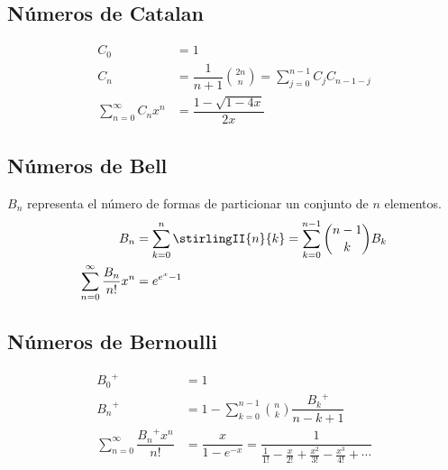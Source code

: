 				\subsection{Números de Catalan}
					\begin{align*}
						C_0 &= 1 \\
						C_n &= \dfrac{1}{n+1}\binom{2n}{n} = \sum_{j=0}^{n-1} C_j C_{n-1-j} \\
						\sum_{n=0}^{\infty} C_n x^n &= \dfrac{1-\sqrt{1-4x}}{2x}
					\end{align*}
				
				\subsection{Números de Bell}
					$B_n$ representa el número de formas de particionar un conjunto de $n$ elementos.
					\begin{align*}
						B_n &= \sum_{k=0}^{n}\stirlingII{n}{k} = \sum_{k=0}^{n-1}\binom{n-1}{k} B_k \\
						\sum_{n=0}^{\infty} \dfrac{B_n}{n!}x^n &= e^{e^x-1}
					\end{align*}
				
				\subsection{Números de Bernoulli}
					\begin{align*}
						{B_0}^+ &= 1 \\
						{B_n}^+ &= 1 - \sum_{k=0}^{n-1}\binom{n}{k}\dfrac{{B_k}^+}{n-k+1} \\
						\sum_{n=0}^{\infty} \dfrac{{B_n}^+ x^n}{n!} &= \dfrac{x}{1-e^{-x}} = \dfrac{1}{\frac{1}{1!}-\frac{x}{2!}+\frac{x^2}{3!}-\frac{x^3}{4!}+\cdots}
					\end{align*}
				
